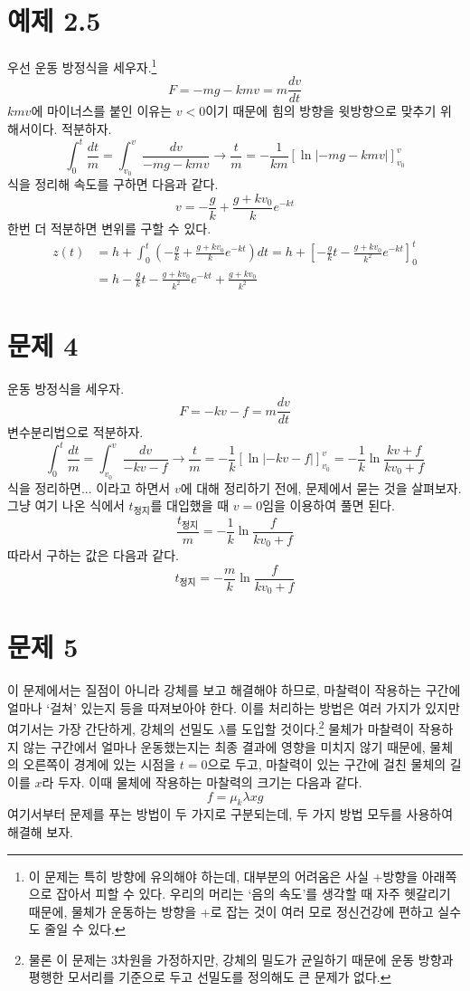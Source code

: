 \documentclass{scrartcl}
\begin{document}
\section{예제 2.5}
우선 운동 방정식을 세우자.\footnote{이 문제는 특히 방향에 유의해야 하는데, 대부분의 어려움은 사실 +방향을 아래쪽으로 잡아서 피할 수 있다. 우리의 머리는 `음의 속도'를 생각할 때 자주 헷갈리기 때문에, 물체가 운동하는 방향을 +로 잡는 것이 여러 모로 정신건강에 편하고 실수도 줄일 수 있다.}
\[F=-mg-kmv=m\frac{dv}{dt}\]
\(kmv\)에 마이너스를 붙인 이유는 \(v<0\)이기 때문에 힘의 방향을 윗방향으로 맞추기 위해서이다. 적분하자.
\[\int^t_0\frac{dt}{m}=\int^v_{v_0}\frac{dv}{-mg-kmv}\longrightarrow\frac{t}{m}=-\frac{1}{km}\left[\ln|-mg-kmv|\right]^v_{v_0}\]
식을 정리해 속도를 구하면 다음과 같다.
\[v=-\frac{g}{k}+\frac{g+kv_0}{k}e^{-kt}\]
한번 더 적분하면 변위를 구할 수 있다.
\begin{align*}
z(t)&=h+\int^t_0\left(-\frac{g}{k}+\frac{g+kv_0}{k}e^{-kt}\right)dt=h+\left[-\frac{g}{k}t-\frac{g+kv_0}{k^2}e^{-kt}\right]^t_0 \\
&=h-\frac{g}{k}t-\frac{g+kv_0}{k^2}e^{-kt}+\frac{g+kv_0}{k^2}
\end{align*}

\section{문제 4}
운동 방정식을 세우자.
\[F=-kv-f=m\frac{dv}{dt}\]
변수분리법으로 적분하자.
\[\int^t_0\frac{dt}{m}=\int^v_{v_0}\frac{dv}{-kv-f}\longrightarrow\frac{t}{m}=-\frac{1}{k}\left[\ln|-kv-f|\right]^v_{v_0}=-\frac{1}{k}\ln\frac{kv+f}{kv_0+f}\]
식을 정리하면... 이라고 하면서 \(v\)에 대해 정리하기 전에, 문제에서 묻는 것을 살펴보자. 그냥 여기 나온 식에서 \(t_\text{정지}\)를 대입했을 때 \(v=0\)임을 이용하여 풀면 된다.
\[\frac{t_\text{정지}}{m}=-\frac{1}{k}\ln\frac{f}{kv_0+f}\]
따라서 구하는 값은 다음과 같다.
\[t_\text{정지}=-\frac{m}{k}\ln\frac{f}{kv_0+f}\]

\section{문제 5}
이 문제에서는 질점이 아니라 강체를 보고 해결해야 하므로, 마찰력이 작용하는 구간에 얼마나 `걸쳐' 있는지 등을 따져보아야 한다. 이를 처리하는 방법은 여러 가지가 있지만 여기서는 가장 간단하게, 강체의 선밀도 \(\lambda\)를 도입할 것이다.\footnote{물론 이 문제는 3차원을 가정하지만, 강체의 밀도가 균일하기 때문에 운동 방향과 평행한 모서리를 기준으로 두고 선밀도를 정의해도 큰 문제가 없다.} 물체가 마찰력이 작용하지 않는 구간에서 얼마나 운동했는지는 최종 결과에 영향을 미치지 않기 때문에, 물체의 오른쪽이 경계에 있는 시점을 \(t=0\)으로 두고, 마찰력이 있는 구간에 걸친 물체의 길이를 \(x\)라 두자. 이때 물체에 작용하는 마찰력의 크기는 다음과 같다.
\[f=\mu_k\lambda xg\]
여기서부터 문제를 푸는 방법이 두 가지로 구분되는데, 두 가지 방법 모두를 사용하여 해결해 보자.
\end{document}
